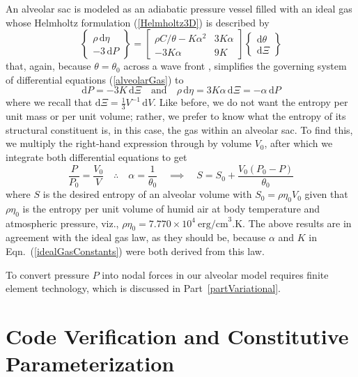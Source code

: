 An alveolar sac is modeled as an adiabatic pressure vessel filled with an ideal gas whose Helmholtz formulation (\ref{Helmholtz3D}) is described by
\begin{equation}
\left\{ \begin{matrix}
\rho \, \mathrm{d} \eta \\ -3 \, \mathrm{d} P
\end{matrix} \right\} = \begin{bmatrix}
\rho C / \theta - K \alpha^2 & 3 K \alpha \\ 
-3K\alpha & 9K
\end{bmatrix} \left\{ \begin{matrix}
\mathrm{d} \theta \\ \mathrm{d} \Xi
\end{matrix} \right\}
\label{alveolarGas}
\end{equation}
that, again, because $\theta = \theta_0$ across a wave front \cite{AmesStaff53}, simplifies the governing system of differential equations (\ref{alveolarGas}) to
\begin{displaymath}
    \mathrm{d}P = -3K \, \mathrm{d} \Xi 
    \quad \text{and} \quad
    \rho \, \mathrm{d} \eta = 3 K \alpha \, \mathrm{d} \Xi = -\alpha \, \mathrm{d}P
\end{displaymath}
where we recall that $\mathrm{d}\Xi = \tfrac{1}{3} V^{-1} \, \mathrm{d} V$.  Like before, we do not want the entropy per unit mass or per unit volume; rather, we prefer to know what the entropy of its structural constituent is, in this case, the gas within an alveolar sac.  To find this, we multiply the right-hand expression through by volume $V_0$, after which we integrate both differential equations to get
\begin{equation}
    \frac{P}{P_0} = \frac{V_0}{V}
    \quad \therefore \quad
    \alpha = \frac{1}{\theta_0}
    \quad \implies \quad
    S = S_0 + \frac{V_0 ( P_0 - P )}{\theta_0}
    \label{alveolarSacCE}
\end{equation}
where $S$ is the desired entropy of an alveolar volume with $S_0 = \rho \eta_0 V_0$ given that $\rho \eta_0$ is the entropy per unit volume of humid air at body temperature and atmospheric pressure, viz., $\rho \eta_0 = 7.770 \times 10^4 \: \text{erg/cm}^3\text{.K}$.  The above results are in agreement with the ideal gas law, as they should be, because $\alpha$ and $K$ in Eqn.~(\ref{idealGasConstants}) were both derived from this law.

To convert pressure $P$ into nodal forces in our alveolar model requires finite element technology, which is discussed in Part~\ref{partVariational}.


\section{Code Verification and Constitutive Parameterization}
